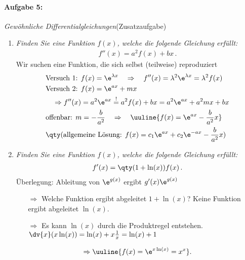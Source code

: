 \paragraph{Aufgabe 5: } \emph{Gewöhnliche Differentialgleichungen}\hfill (Zusatzaufgabe)\\[0.2cm]
\begin{enumerate}[label=(\alph*)]
\item \emph{Finden Sie eine Funktion $f(x)$, welche die folgende Gleichung erfüllt:}
\begin{align*}
f''(x)=a^2f(x)+bx\,.
\end{align*}
Wir suchen eine Funktion, die sich selbst (teilweise) reproduziert 
\begin{align}
    &\text{Versuch 1: } f(x) = \e^{\lambda x} \quad \Rightarrow \quad f''(x) = \lambda^2 \e^{\lambda x} = \lambda^2 f(x) \\
    &\text{Versuch 2: } f(x) = \e^{ax} + mx  \\
    &\quad \Rightarrow f''(x) = a^2 \e^{ax} \overset{!}{=} a^2 f(x) + bx = a^2 \e^{ax} + a^2 mx + bx \\
    &\text{offenbar: } m = -\frac{b}{a^2} \quad \Rightarrow \quad \uuline{f(x) = \e^{ax} - \frac{b}{a^2} x}\\
    &\qty(\text{allgemeine Lösung: } f(x) = c_1 \e^{ax} + c_2 \e^{-ax} - \frac{b}{a^2} x)
\end{align}
\item \emph{Finden Sie eine Funktion $f(x)$, welche die folgende Gleichung erfüllt:}
\begin{align*}
f'(x)=\qty(1+\ln(x))f(x)\,.
\end{align*}
Überlegung: Ableitung von $\e^{g(x)}$ ergibt $g'(x) \e^{g(x)}$
\begin{itemize}
    \item[$\Rightarrow$] Welche Funktion ergibt abgeleitet $1+ \ln(x)$? Keine Funktion ergibt abgeleitet $\ln(x)$. 
    \item[$\Rightarrow$] Es kann $\ln(x)$ durch die Produktregel entstehen. \\
    $\dv{x} (x \ln(x)) = \ln(x) + x \frac{1}{x} = \ln(x)+1$ 
\end{itemize}
\begin{align}
    \Rightarrow \uuline{f(x) = \e^{x \ln(x)} = x^x}.
\end{align}
\end{enumerate}